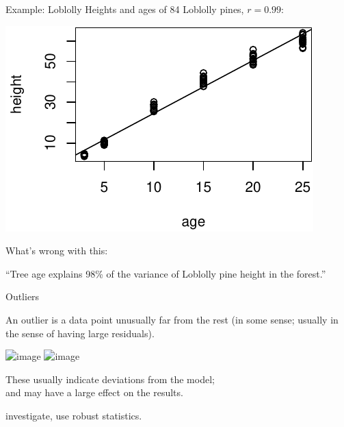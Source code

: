 \begin{frame}{Example: Loblolly}
  Heights and ages of 84 Loblolly pines, \alert{$r=0.99$}:
  \begin{center}
    \includegraphics{loblolly-age-height}
  \end{center}

  \vspace{1em}
  
  What's wrong with this:

  ``Tree age explains 98\% of the variance of Loblolly pine height in the forest.''

\end{frame}



\begin{frame}{Outliers}

    An \alert{outlier} is a data point unusually far from the rest (in some sense; usually in the sense of having \alert{large residuals}).
    \begin{center}
        \includegraphics<1>[width=3in]{fig-12-6-3.png}
        \includegraphics<2>[width=2in]{fig-12-6-3.png}
    \end{center}
    \pause

    These usually indicate deviations from the model;\\
    and may have a large effect on the results.


    \vspace{2em}

     investigate, use robust statistics.

\end{frame}


